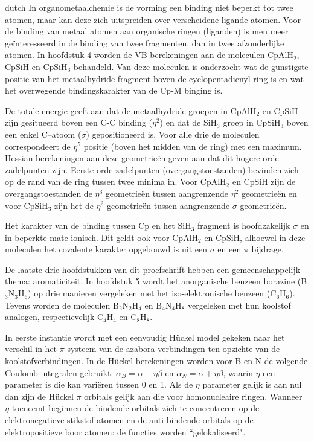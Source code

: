 \begin{otherlanguage*}{dutch}
In organometaalchemie is de vorming een binding niet beperkt tot twee atomen, maar kan deze zich uitspreiden over verscheidene ligande atomen. Voor de binding van metaal atomen aan organische ringen (liganden) is men meer ge\"{i}nteresseerd in de binding van twee fragmenten, dan in twee afzonderlijke atomen. In hoofdstuk 4 worden de VB berekeningen aan de moleculen CpAlH$_2$, CpSiH en CpSiH$_3$ behandeld. Van deze moleculen is onderzocht wat de gunstigste positie van het metaalhydride fragment boven de cyclopentadienyl ring is en wat het overwegende bindingskarakter van de Cp-M binging is. 

De totale energie geeft aan dat de metaalhydride groepen in CpAlH$_2$ en CpSiH zijn gesitueerd boven een C-C binding ($\eta^2$) en dat de SiH$_3$ groep in CpSiH$_3$ boven een enkel C--atoom ($\sigma$) gepositioneerd is. Voor alle drie de moleculen correspondeert de $\eta^5$ positie (boven het midden van de ring) met een maximum. Hessian berekeningen aan deze geometrie\"{e}n geven aan dat dit hogere orde zadelpunten zijn. Eerste orde zadelpunten (overgangstoestanden) bevinden zich op de rand van de ring tussen twee minima in. Voor CpAlH$_2$ en CpSiH zijn de overgangstoestanden de $\eta^3$ geometrie\"{e}n tussen aangrenzende $\eta^2$ geometrie\"{e}n en voor CpSiH$_3$ zijn het de $\eta^2$ geometrie\"{e}n tussen aangrenzende $\sigma$ geometrie\"{e}n.

Het karakter van de binding tussen Cp en het SiH$_3$ fragment is hoofdzakelijk $\sigma$ en in beperkte mate ionisch. Dit geldt ook voor CpAlH$_2$ en CpSiH, alhoewel in deze moleculen het covalente karakter opgebouwd is uit een $\sigma$ en een  $\pi$ bijdrage.

De laatste drie hoofdstukken van dit proefschrift hebben een gemeenschappelijk thema: aromaticiteit. In hoofdstuk 5 wordt het anorganische benzeen borazine (B$_3$N$_3$H$_6$) op drie manieren vergeleken met het iso-elektronische benzeen (C$_6$H$_6$). Tevens worden de moleculen B$_2$N$_2$H$_4$ en B$_4$N$_4$H$_8$ vergeleken met hun koolstof analogen, respectievelijk C$_4$H$_4$ en C$_8$H$_8$.

In eerste instantie wordt met een eenvoudig H\"uckel model gekeken naar het verschil in het $\pi$ systeem van de azabora verbindingen ten opzichte van de koolstofverbindingen. In de H\"uckel berekeningen worden voor B en N de volgende Coulomb integralen gebruikt: $\alpha_B = \alpha - \eta\beta$ en $\alpha_N = \alpha + \eta\beta$, waarin $\eta$ een parameter is die kan vari\"eren tussen 0 en 1. Als de $\eta$ parameter gelijk  is aan  nul dan zijn de H\"uckel $\pi$ orbitals gelijk aan die voor homonucleaire ringen. Wanneer $\eta$ toeneemt beginnen de bindende orbitals zich te concentreren op de elektronegatieve stikstof atomen en de anti-bindende orbitals op de elektropositieve boor atomen: de functies worden ``gelokaliseerd".


\end{otherlanguage*}
